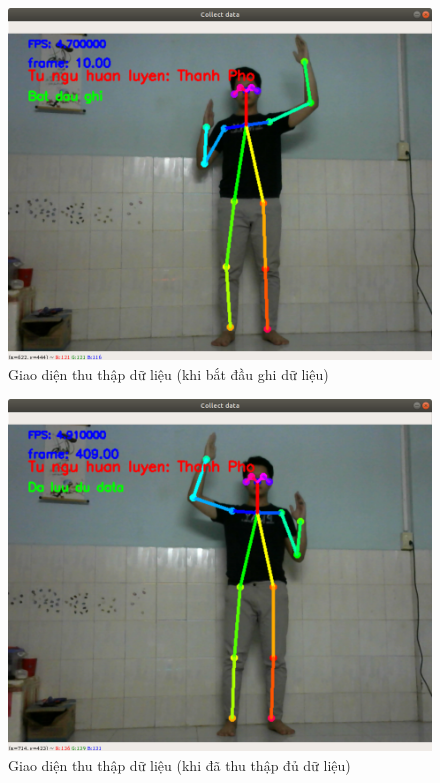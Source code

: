 \FloatBarrier
\begin{figure}[htp]
\begin{center}
\includegraphics[scale=0.4]{chap4/c4_figs/collect_data.png}
\end{center}
\caption{Giao diện thu thập dữ liệu (khi bắt đầu ghi dữ liệu)}
\label{fig:collect_data}
\end{figure}

\begin{figure}[htp]
\begin{center}
\includegraphics[scale=0.4]{chap4/c4_figs/collect_data1.png}
\end{center}
\caption{Giao diện thu thập dữ liệu (khi đã thu thập đủ dữ liệu)}
\label{fig:collect_data1}
\end{figure}
\FloatBarrier

